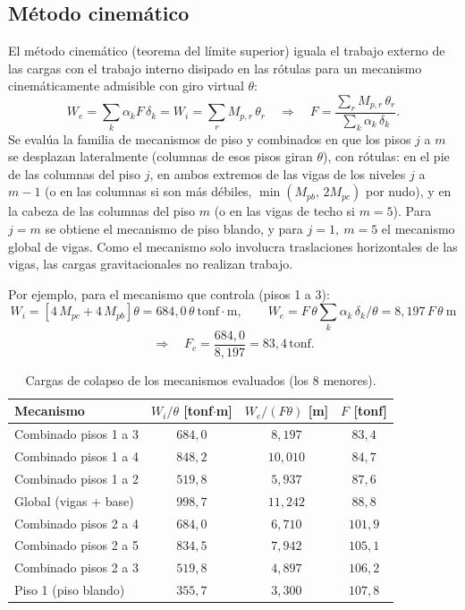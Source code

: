 \documentclass[11pt,letterpaper]{article}
\newcommand{\tonf}{\,\mathrm{tonf}}
\begin{document}
\subsection{Método cinemático}
El método cinemático (teorema del límite superior) iguala el trabajo externo de las cargas con el trabajo interno
disipado en las rótulas para un mecanismo cinemáticamente admisible con giro virtual $\theta$:
\[
W_e = \sum_k \alpha_k F\,\delta_k = W_i = \sum_r M_{p,r}\,\theta_r
\quad\Rightarrow\quad
F = \frac{\sum_r M_{p,r}\,\theta_r}{\sum_k \alpha_k\,\delta_k}.
\]
Se evalúa la familia de mecanismos de piso y combinados en que los pisos $j$ a $m$ se desplazan lateralmente
(columnas de esos pisos giran $\theta$), con rótulas: en el pie de las columnas del piso $j$, en ambos extremos de
las vigas de los niveles $j$ a $m-1$ (o en las columnas si son más débiles, $\min(M_{pb},\,2M_{pc})$ por nudo),
y en la cabeza de las columnas del piso $m$ (o en las vigas de techo si $m = 5$). Para $j = m$ se obtiene el
mecanismo de piso blando, y para $j=1,\ m=5$ el mecanismo global de vigas. Como el mecanismo solo
involucra traslaciones horizontales de las vigas, las cargas gravitacionales no realizan trabajo.

Por ejemplo, para el mecanismo que controla (pisos 1 a 3):
\[
W_i = \left[4\,M_{pc} + 4\,M_{pb}\right]\theta
     = 684{,}0\,\theta \ \mathrm{tonf\cdot m},
\qquad
W_e = F\,\theta\sum_k \alpha_k\,\delta_k/\theta = 8{,}197\,F\,\theta\ \mathrm{m}
\]
\[
\Rightarrow\quad F_c = \frac{684{,}0}{8{,}197} = 83{,}4\tonf .
\]

\begin{table}[H]
\centering
\caption{Cargas de colapso de los mecanismos evaluados (los 8 menores).}
\begin{tabular}{lccc}
\toprule
Mecanismo & $W_i/\theta$ [tonf$\cdot$m] & $W_e/(F\theta)$ [m] & $F$ [tonf] \\
\midrule
Combinado pisos 1 a 3 & $684{,}0$ & $8{,}197$ & $83{,}4$ \\
Combinado pisos 1 a 4 & $848{,}2$ & $10{,}010$ & $84{,}7$ \\
Combinado pisos 1 a 2 & $519{,}8$ & $5{,}937$ & $87{,}6$ \\
Global (vigas + base) & $998{,}7$ & $11{,}242$ & $88{,}8$ \\
Combinado pisos 2 a 4 & $684{,}0$ & $6{,}710$ & $101{,}9$ \\
Combinado pisos 2 a 5 & $834{,}5$ & $7{,}942$ & $105{,}1$ \\
Combinado pisos 2 a 3 & $519{,}8$ & $4{,}897$ & $106{,}2$ \\
Piso 1 (piso blando) & $355{,}7$ & $3{,}300$ & $107{,}8$ \\
\bottomrule
\end{tabular}
\end{table}
\end{document}
